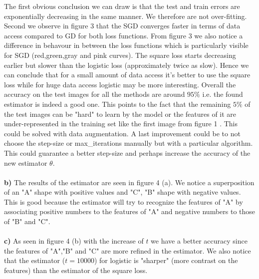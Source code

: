 \documentclass[10pt,a4paper]{article}
\begin{document}
The first obvious conclusion we can draw is that the test and train errors are exponentially decreasing in the same manner. We therefore are not over-fitting. Second  we observe in figure 3  that the SGD converges faster in terms of data access compared to GD for both loss functions. From figure 3 we also notice a difference in behavour in between the loss functions which is particularly visible for SGD (red,green,gray and pink curves). The square loss starts decreasing earlier but slower than the logistic loss (approximately twice as slow). Hence we can conclude that for a small amount of data access it's better to use the square loss while for huge data access logistic may be more interesting. Overall the accuracy on the test images for all the methods are around $95\%$ i.e. the found estimator is indeed a good one. This points to the fact that the remaining $5\%$ of the test images can be "hard" to learn by the model or the features of it are under-represented in the training set like the first image from figure 1 . This could be solved with data augmentation. A last improvement could be to not choose the step-size or max\_iterations manually but with a particular algorithm. This could guarantee a better step-size and perhaps increase the accuracy of the new estimator $\theta$. \\\\
\textbf{b)}  The results of the estimator are seen in figure 4 (a). We notice a superposition of an "A" shape with positive values and "C", "B" shape with negative values. This is good because the estimator will try to recognize the features of "A" by associating positive numbers to the features of "A" and negative numbers to those of "B" and "C".\\\\
\textbf{c)} As seen in figure 4 (b) with the increase of $t$ we have a better accuracy since the features of "A","B" and "C" are more refined in the estimator. We also notice that the estimator ($t = 10000$) for logistic is "sharper" (more contrast on the features) than the estimator of the square loss.
\end{document}
